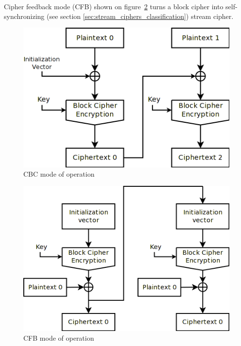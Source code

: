 Cipher feedback mode (CFB) shown on figure~\ref{fig:mode-cfb} turns a block
cipher into self-synchronizing 
(see section \ref{sec:stream_ciphers_classification}) stream cipher. 
\begin{figure}[htbp]
	\centering
	\includegraphics[scale=0.6]{images/modes_cbc}
	\caption{CBC mode of operation}
	\label{fig:mode-cbc}
\end{figure}
\begin{figure}[htbp]
	\centering
	\includegraphics[scale=0.6]{images/modes_cfb}
	\caption{CFB mode of operation}
	\label{fig:mode-cfb}
\end{figure}

